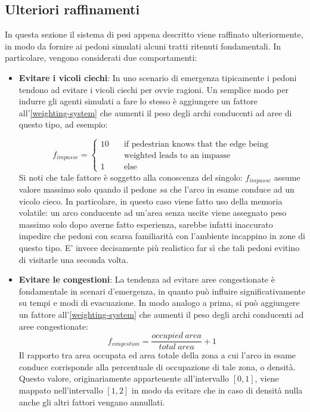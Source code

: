 \documentclass[12pt,a4paper,openright,oneside]{book}
\begin{document}
\subsection{Ulteriori raffinamenti}
In questa sezione il sistema di pesi appena descritto viene raffinato ulteriormente, in modo da fornire ai pedoni simulati alcuni tratti ritenuti fondamentali. In particolare, vengono considerati due comportamenti:
\begin{itemize}
 \item \textbf{Evitare i vicoli ciechi}: In uno scenario di emergenza tipicamente i pedoni tendono ad evitare i vicoli ciechi per ovvie ragioni. Un semplice modo per indurre gli agenti simulati a fare lo stesso è aggiungere un fattore all'\cref{weighting-system} che aumenti il peso degli archi conducenti ad aree di questo tipo, ad esempio:
 
 \begin{equation}
 f_{impasse} =
  \begin{cases}
    10       & \quad \text{if pedestrian knows that the edge being}\\
             & \quad \text{weighted leads to an impasse}\\
    1        & \quad \text{else}
  \end{cases}
 \end{equation}
 Si noti che tale fattore è soggetto alla conoscenza del singolo: \(f_{impasse}\) assume valore massimo solo quando il pedone \emph{sa} che l'arco in esame conduce ad un vicolo cieco. In particolare, in questo caso viene fatto uso della memoria volatile: un arco conducente ad un'area senza uscite viene assegnato peso massimo solo dopo averne fatto esperienza, sarebbe infatti inaccurato impedire che pedoni con scarsa familiarità con l'ambiente incappino in zone di questo tipo. E' invece decisamente più realistico far sì che tali pedoni evitino di visitarle una seconda volta.
 \item \textbf{Evitare le congestioni}: La tendenza ad evitare aree congestionate è fondamentale in scenari d'emergenza, in quanto può influire significativamente su tempi e modi di evacuazione. In modo analogo a prima, si può aggiungere un fattore all'\cref{weighting-system} che aumenti il peso degli archi conducenti ad aree congestionate:
 \begin{equation}
 f_{congestion} = \frac{occupied\ area}{total\ area} + 1
 \end{equation}
 Il rapporto tra area occupata ed area totale della zona a cui l'arco in esame conduce corrisponde alla percentuale di occupazione di tale zona, o densità. Questo valore, originariamente appartenente all'intervallo \([0,1]\), viene mappato nell'intervallo \([1,2]\) in modo da evitare che in caso di densità nulla anche gli altri fattori vengano annullati.
 

\end{itemize}
\end{document}
